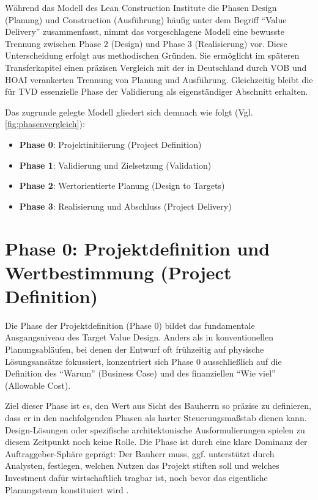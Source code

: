 Während das Modell des Lean Construction Institute die Phasen Design (Planung) und Construction (Ausführung) häufig unter dem Begriff \enquote{Value Delivery} zusammenfasst\autocite[Vgl.][S.~35]{hill_target_2017}, nimmt das vorgeschlagene Modell eine bewusste Trennung zwischen Phase 2 (Design) und Phase 3 (Realisierung) vor. Diese Unterscheidung erfolgt aus methodischen Gründen. Sie ermöglicht im späteren Transferkapitel einen präzisen Vergleich mit der in Deutschland durch \acs{VOB} und \ac{HOAI} verankerten Trennung von Planung und Ausführung. Gleichzeitig bleibt die für \ac{TVD} essenzielle Phase der Validierung als eigenständiger Abschnitt erhalten.

Das zugrunde gelegte Modell gliedert sich demnach wie folgt (Vgl. \cref{fig:phasenvergleich}):
\begin{itemize}[leftmargin=2em]
    \item \textbf{Phase 0}: Projektinitiierung (Project Definition)
    \item \textbf{Phase 1}: Validierung und Zielsetzung (Validation)
    \item \textbf{Phase 2}: Wertorientierte Planung (Design to Targets)
    \item \textbf{Phase 3}: Realisierung und Abschluss (Project Delivery)
\end{itemize}



\clearpage

\section{Phase 0: Projektdefinition und Wertbestimmung (Project Definition)}
\label{sec:4.2}

Die Phase der Projektdefinition (Phase 0) bildet das fundamentale Ausgangsniveau des Target Value Design. Anders als in konventionellen Planungsabläufen, bei denen der Entwurf oft frühzeitig auf physische Lösungsansätze fokussiert, konzentriert sich Phase 0 ausschließlich auf die Definition des \enquote{Warum} (Business Case) und des finanziellen \enquote{Wie viel} (Allowable Cost)\autocite[Vgl.][S.~12 f]{ballard_target_2012}.

Ziel dieser Phase ist es, den Wert aus Sicht des Bauherrn so präzise zu definieren, dass er in den nachfolgenden Phasen als harter Steuerungsmaßstab dienen kann. Design-Lösungen oder spezifische architektonische Ausformulierungen spielen zu diesem Zeitpunkt noch keine Rolle. Die Phase ist durch eine klare Dominanz der Auftraggeber-Sphäre geprägt: Der Bauherr muss, ggf. unterstützt durch Analysten, festlegen, welchen Nutzen das Projekt stiften soll und welches Investment dafür wirtschaftlich tragbar ist, noch bevor das eigentliche Planungsteam konstituiert wird \autocite[Vgl.][S.~5--7]{ballard_target_2025}.

